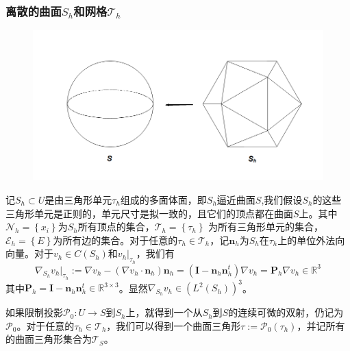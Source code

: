 \subsubsection{离散的曲面$S_h$和网格$\mathcal{T}_h$}
\begin{figure}[H]
\centering
\includegraphics[scale=0.4]{Contents/chapter6/figures/picture_1.png}
\end{figure}
记$S_h\subset U$是由三角形单元$\tau_h$组成的多面体面，即$S_h$逼近曲面$S$,我们假设$S_h$的这些三角形单元是正则的，单元尺寸是拟一致的，且它们的顶点都在曲面$S$上。其中$\mathcal{N}_h=\left\{x_i\right\}$为$S_h$所有顶点的集合，$\mathcal{T}_h=\left\{\tau_h\right\}$ 为所有三角形单元的集合，$\mathcal{E}_h=\left\{E\right\}$为所有边的集合。对于任意的$\tau_h\in\mathcal{T}_h$，记$\boldsymbol{n}_h$为$S_h$在$\tau_h$上的单位外法向向量。对于$v_h\in C(S_h)$和$v_h|_{\tau_h}$，我们有
\begin{equation}
\nabla_{S_h}v_h|_{\tau_h}:=\nabla v_h-(\nabla v_h\cdot\boldsymbol{n}_h)\boldsymbol{n}_h=(\boldsymbol{I}-\boldsymbol{n}_h\boldsymbol{n}^t_h)\nabla v_h=\boldsymbol{P}_h\nabla v_h\in\mathbb{R}^3
\end{equation}
其中$\boldsymbol{P}_h=\boldsymbol{I}-\boldsymbol{n}_h\boldsymbol{n}^t_h\in\mathbb{R}^{3\times 3}$。显然$\nabla_{S_h}v_h\in(L^2(S_h))^3$。

如果限制投影$\mathcal{P}_0:U\rightarrow S$到$S_h$上，就得到一个从$S_h$到$S$的连续可微的双射，仍记为$\mathcal{P}_0$。对于任意的$\tau_h\in\mathcal{T}_h$，我们可以得到一个曲面三角形$\tau:=\mathcal{P}_0(\tau_h)$，并记所有的曲面三角形集合为$\mathcal{T}_S$。

